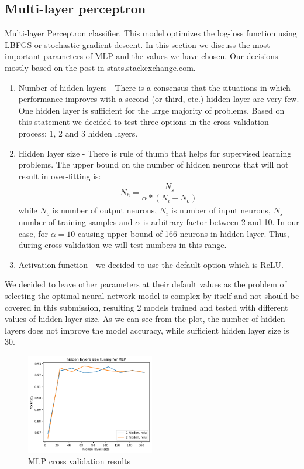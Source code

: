 \documentclass[12pt]{article}
\begin{document}
\subsection{Multi-layer perceptron}
Multi-layer Perceptron classifier. This model optimizes the log-loss function using LBFGS or stochastic gradient descent. In this section we discuss the most important parameters of MLP and the values we have chosen. Our decisions mostly based on the post in \href{https://stats.stackexchange.com/questions/181/how-to-choose-the-number-of-hidden-layers-and-nodes-in-a-feedforward-neural-netw}{stats.stackexchange.com}.
\begin{enumerate}
	\item Number of hidden layers - There is a consensus that the situations in which performance improves with a second (or third, etc.) hidden layer are very few. One hidden layer is sufficient for the large majority of problems. Based on this statement we decided to test three options in the cross-validation process: 1, 2 and 3 hidden layers.
	\item Hidden layer size - There is rule of thumb that helps for supervised learning problems. The upper bound on the number of hidden neurons that will not result in over-fitting is:
\begin{gather*}
N_h = \dfrac{N_s}{\alpha * (N_i + N_o)}
\end{gather*}
while $N_o$ is number of output neurons, $N_i$ is number of input neurons, $N_s$ number of training samples and $\alpha$ is arbitrary factor between 2 and 10. In our case, for $\alpha = 10$ 
causing upper bound of 166 neurons in hidden layer. Thus, during cross validation we will test numbers in this range.
	\item Activation function - we decided to use the default option which is ReLU.
\end{enumerate}

We decided to leave other parameters at their default values as the problem of selecting the optimal neural network model is complex by itself and not should be covered in this submission, resulting 2 models trained and tested with different values of hidden layer size. As we can see from the plot, the number of hidden layers does not improve the model accuracy, while sufficient hidden layer size is 30.  

\begin{figure}[h]
\centering
\includegraphics[width=0.5\textwidth]{Cross_valid_plots/mlp_h_fig}
\caption{MLP cross validation results}
\end{figure}
\end{document}
